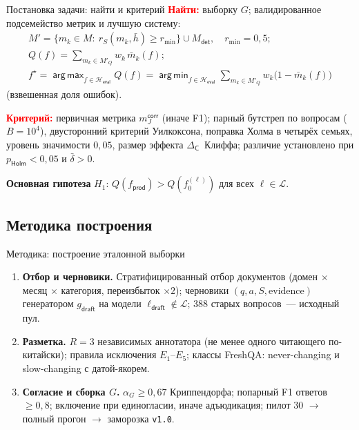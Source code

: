 \documentclass[t]{beamer}
\newcommand{\key}[1]{\textcolor{red}{\textbf{#1}}}  %
\let\mathrm\mathsf  %
\newcommand{\Heval}{\mathcal{H}_{\mathrm{eval}}}
\newcommand{\Lm}{\mathcal{L}}
\newcommand{\fprod}{f_{\mathrm{prod}}}
\newcommand{\ldraft}{\ell_{\mathrm{draft}}}
\newcommand{\gdraft}{g_{\mathrm{draft}}}
\newcommand{\mcorr}{m_J^{\mathrm{corr}}}
\newcommand{\rS}{r_{S}}
\newcommand{\rmin}{r_{\min}}
\newcommand{\DC}{\Delta_{\mathrm{C}}}
\newcommand{\Mdet}{M_{\mathrm{det}}}
\newcommand{\MQ}{M'_{Q}}
\DeclareMathOperator*{\argmax}{arg\,max}
\DeclareMathOperator*{\argmin}{arg\,min}
\begin{document}
\begin{frame}{Постановка задачи: найти и критерий}
    \small
    \key{Найти:} выборку $G$; валидированное подсемейство метрик и лучшую систему:
    \begin{gather*}
        M'=\{m_k\in M:\ \rS(m_k,\bar h)\ge\rmin\}\cup\Mdet,\quad \rmin=0{,}5;\\
        Q(f)=\sum_{m_k\in\MQ} w_k\,\bar m_k(f);\\
        f^\star=\argmax_{f\in\Heval} Q(f)=\argmin_{f\in\Heval}\sum_{m_k\in\MQ} w_k\bigl(1-\bar m_k(f)\bigr)
    \end{gather*}
    (взвешенная доля ошибок).

    \medskip
    \key{Критерий:} первичная метрика $\mcorr$ (иначе F1); парный бутстреп по вопросам ($B=10^4$), двусторонний критерий Уилкоксона, поправка Холма в четырёх семьях, уровень значимости $0{,}05$, размер эффекта $\DC$~Клиффа; различие установлено при $p_{\mathrm{Holm}}<0{,}05$ и $\bar\delta>0$.

    \medskip
    \textbf{Основная гипотеза} $H_1$: $Q(\fprod)>Q(f_0^{(\ell)})$ для всех $\ell\in\Lm$.
\end{frame}

\subsection{Методика построения}

\begin{frame}{Методика: построение эталонной выборки}
    \small
    \begin{enumerate}
        \item \textbf{Отбор и черновики.} Стратифицированный отбор документов (домен $\times$ месяц $\times$ категория, переизбыток $\times2$); черновики $(q,a,S,\text{evidence})$ генератором $\gdraft$ на модели $\ldraft\notin\Lm$; 388 старых вопросов~--- исходный пул.
        \item \textbf{Разметка.} $R=3$ независимых аннотатора (не менее одного читающего по-китайски); правила исключения $E_1$--$E_5$; классы FreshQA: never-changing и slow-changing с датой-якорем.
        \item \textbf{Согласие и сборка $G$.} $\alpha_G\ge0{,}67$ Криппендорфа; попарный F1 ответов $\ge0{,}8$; включение при единогласии, иначе адъюдикация; пилот 30 $\to$ полный прогон $\to$ заморозка \texttt{v1.0}.
    \end{enumerate}
\end{frame}
\end{document}
